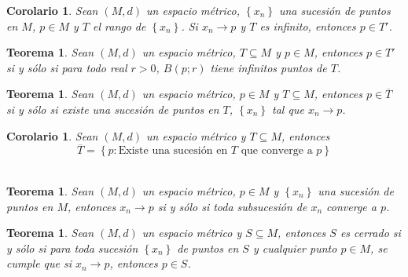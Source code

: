 \documentclass[oneside]{book} %
\theoremstyle{Teorema}
\newtheorem{Teorema}[Definicion]{Teorema}
\newtheorem{Corolario}[Definicion]{Corolario}
\theoremstyle{Ejemplos}
\theoremstyle{[Obs]}
\renewcommand{\{}{\left\lbrace} %
\renewcommand{\}}{\right\rbrace} %
\renewcommand{\sc}{\subseteq} %
\begin{document}
			\begin{Corolario}
				
				Sean $(M, d)$ un espacio métrico, $\{ x_n \}$ una sucesión de puntos en $M$, $p \in M$ y $T$ el rango de $\{ x_n \}$. Si $x_n \to p$ y $T$ es infinito, entonces $p \in T'$. \\

			\end{Corolario}

			\begin{Teorema}
				
				Sean $(M, d)$ un espacio métrico, $T \sc M$ y $p \in M$, entonces $p \in T'$ si y sólo si para todo real $r > 0$, $B(p;r)$ tiene infinitos puntos de $T$. \\

			\end{Teorema}

			\begin{Teorema}
				
				Sean $(M, d)$ un espacio métrico, $p \in M$ y $T \sc M$, entonces $p \in \overline{T}$ si y sólo si existe una sucesión de puntos en $T$, $\{ x_n \}$ tal que $x_n \to p$. \\

			\end{Teorema}

			\begin{Corolario}
				
				Sean $(M, d)$ un espacio métrico y $T \sc M$, entonces \\

				\[ \overline{T} = \{ p : \text{Existe una sucesión en } T \text{ que converge a } p \} \] \\

			\end{Corolario}

			\begin{Teorema}
				
				Sean $(M, d)$ un espacio métrico, $p \in M$ y $\{ x_n \}$ una sucesión de puntos en $M$, entonces $x_n \to p$ si y sólo si toda subsucesión de $x_n$ converge a $p$. \\

			\end{Teorema}

			\begin{Teorema}
				
				Sean $(M, d)$ un espacio métrico y $S \sc M$, entonces $S$ es cerrado si y sólo si para toda sucesión $\{ x_n \}$ de puntos en $S$ y cualquier punto $p \in M$, se cumple que si $x_n \to p$, entonces $p \in S$. \\ 

			\end{Teorema}
\end{document}
